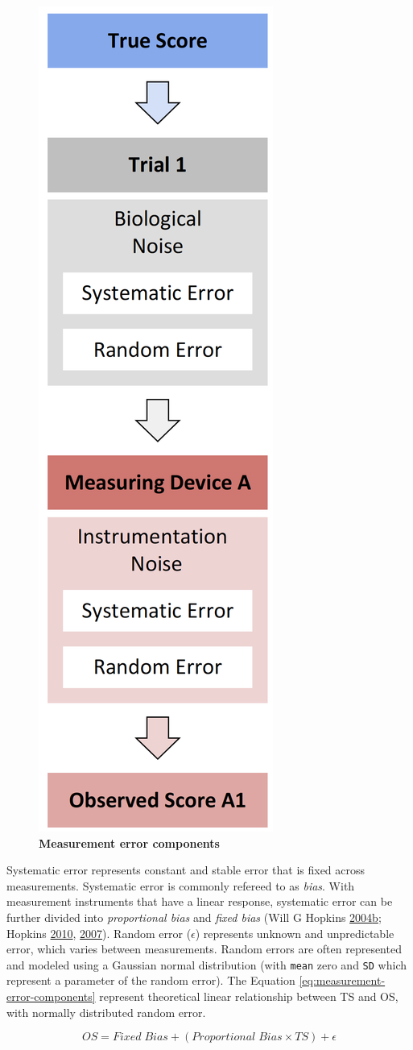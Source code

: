 \documentclass[
]{book}
\begin{document}
\begin{figure}

{\centering \includegraphics[width=0.2\linewidth]{figures/measurement-error-model} 

}

\caption{\textbf{Measurement error components}}\label{fig:measurement-error}
\end{figure}



Systematic error represents constant and stable error that is fixed across measurements. Systematic error is commonly refereed to as \emph{bias}. With measurement instruments that have a linear response, systematic error can be further divided into \emph{proportional bias} and \emph{fixed bias} (Will G Hopkins \protect\hyperlink{ref-hopkinsBiasBlandAltmanNot2004}{2004}\protect\hyperlink{ref-hopkinsBiasBlandAltmanNot2004}{b}; Hopkins \protect\hyperlink{ref-hopkinsSocraticDialogueComparison2010}{2010}, \protect\hyperlink{ref-hopkinsUnderstandingStatisticsUsing2007}{2007}). Random error (\(\epsilon\)) represents unknown and unpredictable error, which varies between measurements. Random errors are often represented and modeled using a Gaussian normal distribution (with \texttt{mean} zero and \texttt{SD} which represent a parameter of the random error). The Equation \eqref{eq:measurement-error-components} represent theoretical linear relationship between TS and OS, with normally distributed random error.

\begin{equation}
  OS = Fixed\; Bias + (Proportional \; Bias\times TS) + \epsilon
  \label{eq:measurement-error-components}
\end{equation}
\end{document}

